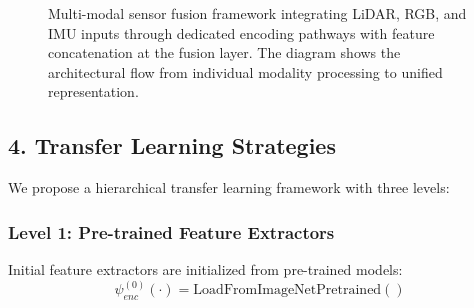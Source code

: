 \documentclass[10pt,a4paper,twocolumn]{article}
\begin{document}
\begin{figure}[h]
    \centering
    \caption{Multi-modal sensor fusion framework integrating LiDAR, RGB, and IMU inputs through dedicated encoding pathways with feature concatenation at the fusion layer. The diagram shows the architectural flow from individual modality processing to unified representation.}
    \label{fig:multimodal_fusion}
\end{figure}

\vfill

\subsection*{4. Transfer Learning Strategies}

We propose a hierarchical transfer learning framework with three levels:

\subsubsection*{Level 1: Pre-trained Feature Extractors}

Initial feature extractors are initialized from pre-trained models:
\begin{equation}
    \psi^{(0)}_{enc}(\cdot) = \text{LoadFromImageNetPretrained}()
\end{equation}
\end{document}
